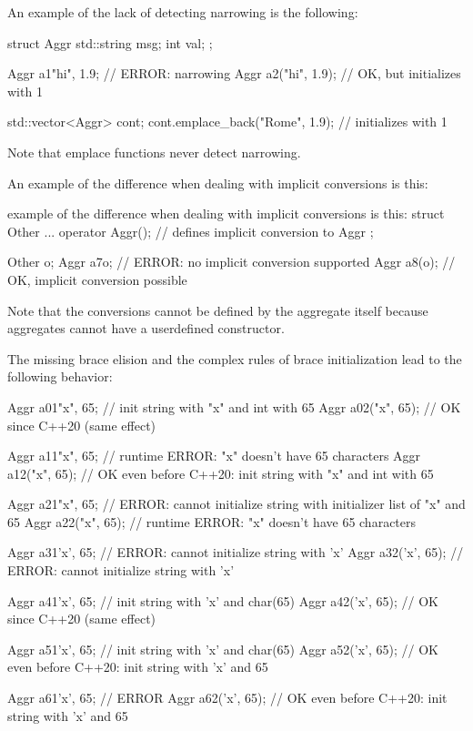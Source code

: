 An example of the lack of detecting narrowing is the following:

\begin{cpp}
struct Aggr {
	std::string msg;
	int val;
};

Aggr a1{"hi", 1.9}; // ERROR: narrowing
Aggr a2("hi", 1.9); // OK, but initializes with 1

std::vector<Aggr> cont;
cont.emplace_back("Rome", 1.9); // initializes with 1
\end{cpp}

Note that emplace functions never detect narrowing.

An example of the difference when dealing with implicit conversions is this:

\begin{cpp}
example of the difference when dealing with implicit conversions is this:
struct Other {
	...
	operator Aggr(); // defines implicit conversion to Aggr
};

Other o;
Aggr a7{o}; // ERROR: no implicit conversion supported
Aggr a8(o); // OK, implicit conversion possible
\end{cpp}

Note that the conversions cannot be defined by the aggregate itself because aggregates cannot have a userdefined constructor.

The missing brace elision and the complex rules of brace initialization lead to the following behavior:

\begin{cpp}
Aggr a01{"x", 65}; // init string with "x" and int with 65
Aggr a02("x", 65); // OK since C++20 (same effect)

Aggr a11{{"x", 65}}; // runtime ERROR: "x" doesn’t have 65 characters
Aggr a12({"x", 65}); // OK even before C++20: init string with "x" and int with 65

Aggr a21{{{"x", 65}}}; // ERROR: cannot initialize string with initializer list of "x" and 65
Aggr a22({{"x", 65}}); // runtime ERROR: "x" doesn’t have 65 characters

Aggr a31{'x', 65}; // ERROR: cannot initialize string with ’x’
Aggr a32('x', 65); // ERROR: cannot initialize string with ’x’

Aggr a41{{'x', 65}}; // init string with ’x’ and char(65)
Aggr a42({'x', 65}); // OK since C++20 (same effect)

Aggr a51{{{'x', 65}}}; // init string with ’x’ and char(65)
Aggr a52({{'x', 65}}); // OK even before C++20: init string with ’x’ and 65

Aggr a61{{{{'x', 65}}}}; // ERROR
Aggr a62({{{'x', 65}}}); // OK even before C++20: init string with ’x’ and 65
\end{cpp}

